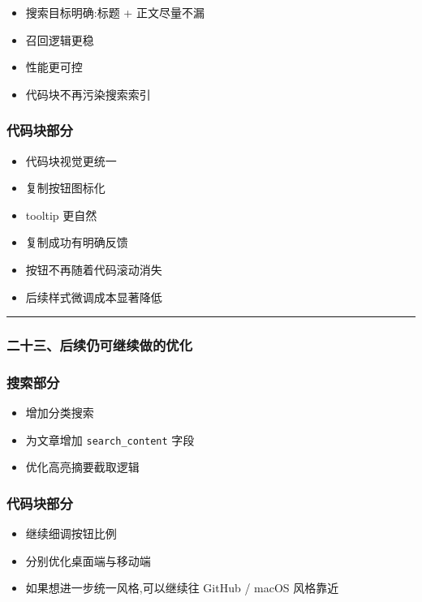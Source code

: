 \documentclass[lang=cn,scheme=chinese,color=blue,device=normal,toc=onecol,math=cm]{elegantbook}
\begin{document}
\begin{itemize}
\item 搜索目标明确:标题 + 正文尽量不漏
\item 召回逻辑更稳
\item 性能更可控
\item 代码块不再污染搜索索引
\end{itemize}


\subsubsection{代码块部分}


\begin{itemize}
\item 代码块视觉更统一
\item 复制按钮图标化
\item tooltip 更自然
\item 复制成功有明确反馈
\item 按钮不再随着代码滚动消失
\item 后续样式微调成本显著降低
\end{itemize}


\medskip\hrule\medskip


\subsubsection{二十三、后续仍可继续做的优化}


\subsubsection{搜索部分}


\begin{itemize}
\item 增加分类搜索
\item 为文章增加 \texttt{search\_\allowbreak{}content} 字段
\item 优化高亮摘要截取逻辑
\end{itemize}


\subsubsection{代码块部分}


\begin{itemize}
\item 继续细调按钮比例
\item 分别优化桌面端与移动端
\item 如果想进一步统一风格,可以继续往 GitHub /\allowbreak{} macOS 风格靠近
\end{itemize}
\end{document}
